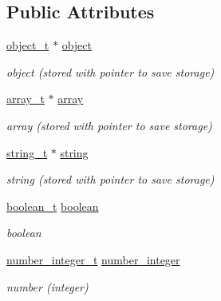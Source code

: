 \subsection*{Public Attributes}
\begin{DoxyCompactItemize}
\item 
\mbox{\hyperlink{classnlohmann_1_1basic__json_a5e48a7893520e1314bf0c9723e26ea2a}{object\+\_\+t}} $\ast$ \mbox{\hyperlink{unionnlohmann_1_1basic__json_1_1json__value_a4a2209bb26e7088cd36bf24824ab5521}{object}}
\begin{DoxyCompactList}\small\item\em object (stored with pointer to save storage) \end{DoxyCompactList}\item 
\mbox{\hyperlink{classnlohmann_1_1basic__json_ae095578e03df97c5b3991787f1056374}{array\+\_\+t}} $\ast$ \mbox{\hyperlink{unionnlohmann_1_1basic__json_1_1json__value_a7947687f3ae1911d6e9847e2b3226157}{array}}
\begin{DoxyCompactList}\small\item\em array (stored with pointer to save storage) \end{DoxyCompactList}\item 
\mbox{\hyperlink{classnlohmann_1_1basic__json_a61f8566a1a85a424c7266fb531dca005}{string\+\_\+t}} $\ast$ \mbox{\hyperlink{unionnlohmann_1_1basic__json_1_1json__value_a9856fb4271b50d738e14c5a9a2f05118}{string}}
\begin{DoxyCompactList}\small\item\em string (stored with pointer to save storage) \end{DoxyCompactList}\item 
\mbox{\hyperlink{classnlohmann_1_1basic__json_a4c919102a9b4fe0d588af64801436082}{boolean\+\_\+t}} \mbox{\hyperlink{unionnlohmann_1_1basic__json_1_1json__value_afd0f8ec00c40301efffd01a276959371}{boolean}}
\begin{DoxyCompactList}\small\item\em boolean \end{DoxyCompactList}\item 
\mbox{\hyperlink{classnlohmann_1_1basic__json_a98e611d67b7bd75307de99c9358ab2dc}{number\+\_\+integer\+\_\+t}} \mbox{\hyperlink{unionnlohmann_1_1basic__json_1_1json__value_afa3c414445aeffb56a7c6926f9420941}{number\+\_\+integer}}
\begin{DoxyCompactList}\small\item\em number (integer) \end{DoxyCompactList}\item 

\end{DoxyCompactItemize}
